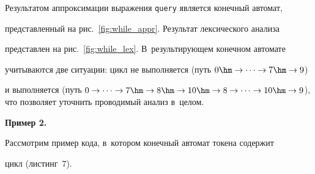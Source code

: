 Результатом аппроксимации выражения \verb"query" является конечный автомат, 


представленный на рис.~\ref{fig:while_appr}. Результат лексического анализа 


представлен на рис.~\ref{fig:while_lex}. В~результирующем конечном автомате 


учитываются две ситуации: цикл не выполняется (путь $0 \hm\to \cdots \to 7 \hm\to 9$) 


и выполняется (путь $0 \to \cdots \to 7 \hm\to 8 \hm\to 10 \hm\to 8 \to \cdots \to 10 \hm\to 


9$), что позволяет уточнить проводимый анализ в~целом.





\renewcommand{\figurename}{\protect\bf Рис.}


\setcounter{figure}{5}








\textbf{{Пример 2.}}\


Рассмотрим пример кода, в~котором конечный автомат токена содержит 


цикл (листинг~7).





